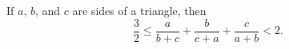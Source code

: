 If $a$, $b$, and $c$ are sides of a triangle, then
\[ \frac{3}{2} \leq \frac{a}{b + c} + \frac{b}{c + a} + \frac{c}{a + b} < 2. \]
